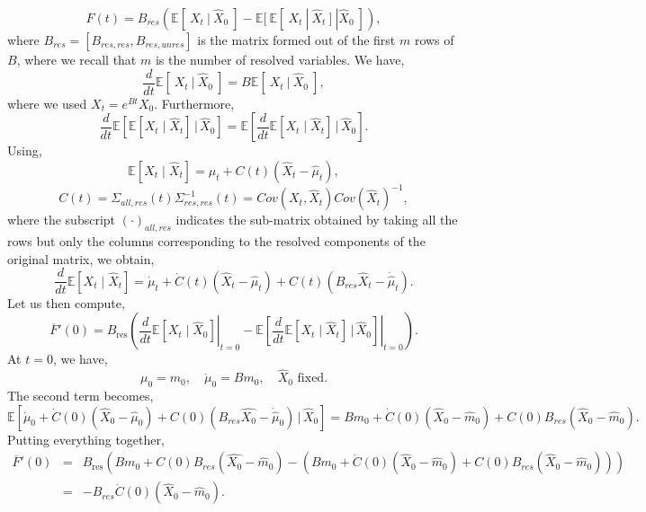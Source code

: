 \documentclass[11pt, a4paper, oneside, reqno]{amsart}
\begin{document}
\[
F(t)=B_{res}(\mathbb{E}[ \ X_t \ | \ \hat{X}_0 \ ] - \mathbb{E}[ \ \mathbb{E}[\ X_t \ | \ \hat{X}_t\ ]\ | \hat{X}_0 \ ]),
\]
where $B_{res} = [B_{res,res}, B_{res,unres}]$ is the matrix formed out of the first $m$ rows of $B$, where we recall that $m$ is the number of resolved variables. We have,
\[
\frac{d}{dt}\mathbb{E}[ \ X_t \ | \ \hat{X}_0 \ ] = B\mathbb{E}[ \ X_t \ | \ \hat{X}_0 \ ],
\]
where we used $X_t = e^{Bt}X_0$. Furthermore,
\[
\frac{d}{dt} \mathbb{E}\left[ \mathbb{E}[X_t \mid \hat{X}_t] \,\big|\, \hat{X}_0 \right]
= \mathbb{E}\left[ \frac{d}{dt} \mathbb{E}[X_t \mid \hat{X}_t] \,\big|\, \hat{X}_0 \right].
\]
Using,
\[
\mathbb{E}[X_t \mid \hat{X}_t] = \mu_t + C(t)(\hat{X}_t - \hat{\mu}_t),
\]
\[
C(t) = \Sigma_{all, res}(t)\Sigma^{-1}_{res,res}(t) = Cov(X_t,\hat{X}_t)Cov(\hat{X}_t)^{-1},
\]
where the subscript $(\cdot)_{all,res}$ indicates the sub-matrix obtained by taking all the rows but only the columns corresponding to the resolved components of the original matrix, we obtain,
\[
\frac{d}{dt} \mathbb{E}[X_t \mid \hat{X}_t] = \dot{\mu}_t + \dot{C}(t)(\hat{X}_t - \hat{\mu}_t) + C(t) (B_{res}\hat{X}_t-\dot{\hat{\mu}}_t).
\]
Let us then compute,
\[
\overline{F}'(0) = B_{\text{res}} \left( \left. \frac{d}{dt} \mathbb{E}[X_t \mid \hat{X}_0] \right|_{t=0} 
- \left. \mathbb{E}\left[ \frac{d}{dt} \mathbb{E}[X_t \mid \hat{X}_t] \,\big|\, \hat{X}_0 \right] \right|_{t=0} \right).
\]
At $t=0$, we have,
\[
\mu_0 = m_0, \quad \dot{\mu}_0 = B m_0, \quad \hat{X}_0 \text{ fixed}.
\]
The second term becomes,
\[
\mathbb{E}\left[ \dot{\mu}_0 + \dot{C}(0)(\hat{X}_0 - \hat{\mu}_0) + C(0)(B_{res}\hat{X_0} -\dot{\hat{\mu}}_0) \,\big|\, \hat{X}_0 \right]
= B m_0 + \dot{C}(0)(\hat{X}_0 - \hat{m}_0) + C(0)B_{res}(\hat{X}_0 - \hat{m}_0).
\]
Putting everything together,
\begin{eqnarray}
\overline{F}'(0) &=& B_{\text{res}} \left( Bm_0 + C(0)B_{res}(\hat{X_0}-\hat{m}_0) - \left( B m_0 + \dot{C}(0)(\hat{X}_0 - \hat{m}_0) + C(0) B_{res} (\hat{X}_0 - \hat{m}_0) \right) \right)\nonumber\\
 &=& -B_{res} \dot{C}(0)(\hat{X}_0 - \hat{m}_0).   
\end{eqnarray}
\end{document}
